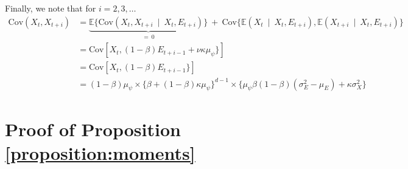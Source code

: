 \documentclass{article}
\begin{document}
Finally, we note that for $i = 2, 3, \dots$
\begin{align*}
\text{Cov}(X_t, X_{t + i}) & = \underbrace{\mathbb{E}\{\text{Cov}(X_t, X_{t + i} \ \mid \ X_t, E_{t + i})\}}_{= \ 0} \ + \ \text{Cov}\{\mathbb{E}(X_t \ \mid \ X_t, E_{t + i}), \mathbb{E}(X_{t + i} \ \mid \ X_t, E_{t + i})\}\\
& = \text{Cov}[X_t, (1 - \beta) E_{t + i - 1} + \nu\kappa\mu_\psi\}]\\
& = \text{Cov}[X_t, (1 - \beta) E_{t + i - 1}\}]\\
& = (1 - \beta)\mu_\psi\times \{\beta + (1 - \beta)\kappa\mu_\psi\}^{d - 1} \times \{\mu_\psi\beta(1 - \beta)(\sigma^2_E - \mu_E) + \kappa\sigma^2_X\}
\end{align*}


\section{Proof of Proposition \ref{proposition:moments}}
\end{document}
